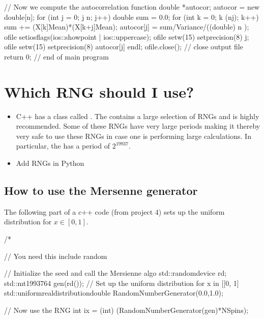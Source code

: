 \documentclass[letterpaper,10pt,english]{sphinxmanual}
\begin{document}
\begin{sphinxVerbatim}[commandchars=\\\{\}]
         // Now we compute the autocorrelation function
         double *autocor;  autocor = new double[n];
         for (int j = 0; j \PYGZlt{} n; j++)\PYGZob{}
           double sum = 0.0;
           for (int k = 0; k \PYGZlt{} (n\PYGZhy{}j); k++)\PYGZob{}
    	 sum  += (X[k]\PYGZhy{}Mean)*(X[k+j]\PYGZhy{}Mean); 
           \PYGZcb{}
           autocor[j] = sum/Variance/((double) n );
           ofile \PYGZlt{}\PYGZlt{} setiosflags(ios::showpoint | ios::uppercase);
           ofile \PYGZlt{}\PYGZlt{} setw(15) \PYGZlt{}\PYGZlt{} setprecision(8) \PYGZlt{}\PYGZlt{} j;
           ofile \PYGZlt{}\PYGZlt{} setw(15) \PYGZlt{}\PYGZlt{} setprecision(8) \PYGZlt{}\PYGZlt{} autocor[j] \PYGZlt{}\PYGZlt{} endl;
         \PYGZcb{}
         ofile.close();  // close output file
         return 0;
    \PYGZcb{}  // end of main program 
\end{sphinxVerbatim}


\section{Which RNG should I use?}
\label{\detokenize{chapter3:which-rng-should-i-use}}\begin{itemize}
\item {} 
C++ has a class called . The  contains a large selection of RNGs and is highly recommended. Some of these RNGs have very large periods making it thereby very safe to use these RNGs in case one is performing large calculations. In particular, the  has a period of \(2^{19937}\).

\item {} 
Add RNGs in Python

\end{itemize}


\subsection{How to use the Mersenne generator}
\label{\detokenize{chapter3:how-to-use-the-mersenne-generator}}
The following part of a c++ code (from project 4) sets up the uniform distribution for \(x\in [0,1]\).

\begin{sphinxVerbatim}[commandchars=\\\{\}]
    /*
    
    //  You need this 
    \PYGZsh{}include \PYGZlt{}random\PYGZgt{}
    
    // Initialize the seed and call the Mersienne algo
    std::random\PYGZus{}device rd;
    std::mt19937\PYGZus{}64 gen(rd());
    // Set up the uniform distribution for x \PYGZbs{}in [[0, 1]
    std::uniform\PYGZus{}real\PYGZus{}distribution\PYGZlt{}double\PYGZgt{} RandomNumberGenerator(0.0,1.0);
    
    // Now use the RNG
    int ix = (int) (RandomNumberGenerator(gen)*NSpins);
\end{sphinxVerbatim}
\end{document}
